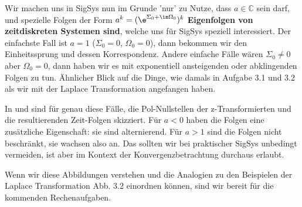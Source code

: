 Wir machen uns in SigSys nun im Grunde 'nur' zu Nutze, dass $a\in\mathbb{C}$
sein darf, und spezielle Folgen der Form $a^k=(\e^{\Sigma_0 +\im\Omega_0})^k$
\textbf{Eigenfolgen von zeitdiskreten Systemen sind}, welche uns für SigSys speziell
interessiert.
%
Der einfachste Fall ist $a=1$ ($\Sigma_0=0$, $\Omega_0=0$),
dann bekommen wir den Einheitssprung und dessen Korrespondenz.
%
Andere einfache Fälle wären $\Sigma_0 \neq 0$ aber $\Omega_0=0$,
dann haben wir es mit exponentiell ansteigenden oder abklingenden Folgen zu tun.
Ähnlicher Blick auf die Dinge, wie damals in Aufgabe 3.1 und 3.2 als wir
mit der Laplace Transformation angefangen haben.

In  und
sind für genau diese Fälle, die Pol-Nullstellen der z-Transformierten
und die resultierenden Zeit-Folgen skizziert.
%
Für $a<0$ haben die Folgen eine zusätzliche Eigenschaft: sie sind alternierend.
Für $a>1$ sind die Folgen nicht beschränkt, sie wachsen also an. Das sollten wir
bei praktischer SigSys unbedingt vermeiden, ist aber im Kontext der
Konvergenzbetrachtung durchaus erlaubt.

Wenn wir diese Abbildungen verstehen und die Analogien zu den Beispielen
der Laplace Transformation Abb. 3.2 einordnen können, sind wir bereit für
die kommenden Rechenaufgaben.








\newpage
